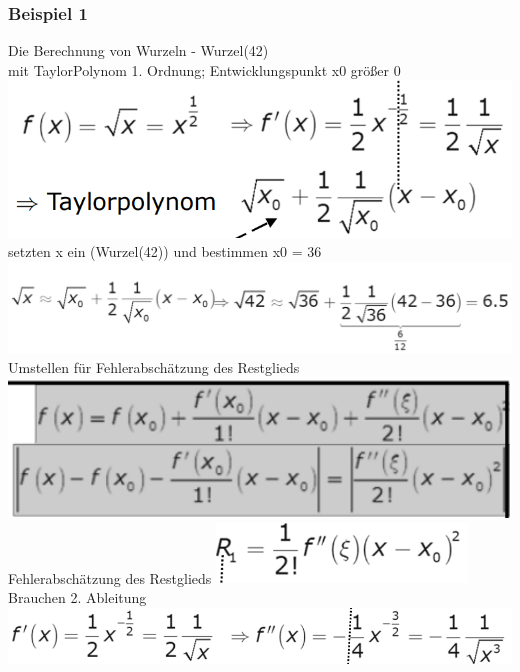 \documentclass[12pt,a4paper]{article}
\begin{document}
\subsubsection{Beispiel 1}
Die Berechnung von Wurzeln - Wurzel(42)\\
mit TaylorPolynom 1. Ordnung; Entwicklungspunkt x0 größer 0\\
\includegraphics[width=1\textwidth]{BIlder/V1/10.png}\\
setzten x ein (Wurzel(42)) und bestimmen x0 = 36\\
\includegraphics[width=1\textwidth]{BIlder/V1/11.png}\\
Umstellen für Fehlerabschätzung des Restglieds\\
\includegraphics[width=1\textwidth]{BIlder/V1/12.png}\\
Fehlerabschätzung des Restglieds 
\includegraphics[width=0.5\textwidth]{BIlder/V1/13.png}\\
Brauchen 2. Ableitung\\
\includegraphics[width=1\textwidth]{BIlder/V1/14.png}\\
\end{document}
